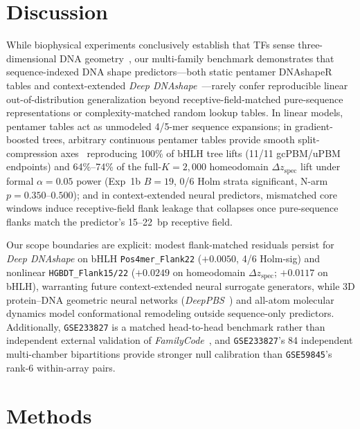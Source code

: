\documentclass[11pt,a4paper]{article}
\begin{document}
\section{Discussion}
While biophysical experiments conclusively establish that TFs sense three-dimensional DNA geometry~\cite{rohs2009nature,joshi2007cell,abe2015cell,afek2020nature}, our multi-family benchmark demonstrates that sequence-indexed DNA shape predictors---both static pentamer DNAshapeR tables and context-extended \emph{Deep DNAshape}~\cite{chiu2016bioinf,li2017nar,li2024natcomm,li2024nar}---rarely confer reproducible linear out-of-distribution generalization beyond receptive-field-matched pure-sequence representations or complexity-matched random lookup tables. In linear models, pentamer tables act as unmodeled 4/5-mer sequence expansions; in gradient-boosted trees, arbitrary continuous pentamer tables provide smooth split-compression axes~\cite{strobl2007bmc,ke2017lightgbm} reproducing 100\% of bHLH tree lifts (11/11 gcPBM/uPBM endpoints) and 64\%--74\% of the full-$K=2{,}000$ homeodomain $\Delta z_{\mathrm{spec}}$ lift under formal $\alpha = 0.05$ power (Exp~1b $B=19$, 0/6 Holm strata significant, N-arm $p = 0.350\text{--}0.500$); and in context-extended neural predictors, mismatched core windows induce receptive-field flank leakage that collapses once pure-sequence flanks match the predictor's 15--22~bp receptive field.

Our scope boundaries are explicit: modest flank-matched residuals persist for \emph{Deep DNAshape} on bHLH \texttt{Pos4mer\_Flank22} ($+0.0050$, 4/6 Holm-sig) and nonlinear \texttt{HGBDT\_Flank15/22} ($+0.0249$ on homeodomain $\Delta z_{\mathrm{spec}}$; $+0.0117$ on bHLH), warranting future context-extended neural surrogate generators, while 3D protein--DNA geometric neural networks (\emph{DeepPBS}~\cite{mitra2024natmeth}) and all-atom molecular dynamics model conformational remodeling outside sequence-only predictors. Additionally, \texttt{GSE233827} is a matched head-to-head benchmark rather than independent external validation of \emph{FamilyCode}~\cite{liu2025nar}, and \texttt{GSE233827}'s 84 independent multi-chamber bipartitions provide stronger null calibration than \texttt{GSE59845}'s rank-6 within-array pairs.

\section{Methods}
\end{document}
